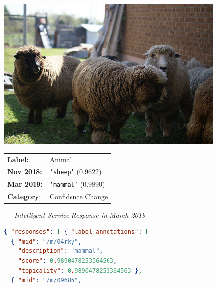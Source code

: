 \begin{figure}
    \begin{framed}
    \centering
    \begin{minipage}{\linewidth}
        \begin{shaded*}
            \begin{minipage}{0.3\linewidth}
            \includegraphics[width=\linewidth]{000000005992}
            \end{minipage}
            \hfill
            \begin{minipage}{0.65\linewidth}
                \begin{tabular}{ll}
                \textbf{Label:}&Animal\\
                \textbf{Nov 2018:}&\texttt{`sheep'} (0.9622)\\
                \textbf{Mar 2019:}&\texttt{`mammal'} (0.9890)\\
                \textbf{Category}:&Confidence Change
                \end{tabular}
            \end{minipage}
            \hfill
        \end{shaded*}
    \end{minipage}
    \begin{minipage}{\linewidth}
        \centering\bigskip
        \noindent\xrfill[0.45ex]{.5pt}~~~\textit{Intelligent Service Response in March 2019}~~~\xrfill[0.45ex]{.5pt}
        \begin{lstlisting}[language=json]
{ "responses": [ { "label_annotations": [
  { "mid": "/m/04rky",
    "description": "mammal",
    "score": 0.9890478253364563,
    "topicality": 0.9890478253364563 },
  { "mid": "/m/09686",

\end{lstlisting}
\end{minipage}
\end{framed}
\end{figure}
